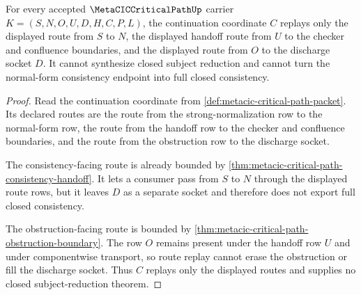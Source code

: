\begin{theorem}
\label{thm:metacic-critical-path-route-replay}
For every accepted $\MetaCICCriticalPathUp$ carrier $K=(S,N,O,U,D,H,C,P,L)$, the continuation coordinate $C$ replays only the displayed route from $S$ to $N$, the displayed handoff route from $U$ to the checker and confluence boundaries, and the displayed route from $O$ to the discharge socket $D$. It cannot synthesize closed subject reduction and cannot turn the normal-form consistency endpoint into full closed consistency.
\end{theorem}
\begin{proof}
Read the continuation coordinate from \autoref{def:metacic-critical-path-packet}. Its declared routes are the route from the strong-normalization row to the normal-form row, the route from the handoff row to the checker and confluence boundaries, and the route from the obstruction row to the discharge socket.

The consistency-facing route is already bounded by \autoref{thm:metacic-critical-path-consistency-handoff}. It lets a consumer pass from $S$ to $N$ through the displayed route rows, but it leaves $D$ as a separate socket and therefore does not export full closed consistency.

The obstruction-facing route is bounded by \autoref{thm:metacic-critical-path-obstruction-boundary}. The row $O$ remains present under the handoff row $U$ and under componentwise transport, so route replay cannot erase the obstruction or fill the discharge socket. Thus $C$ replays only the displayed routes and supplies no closed subject-reduction theorem.
\end{proof}

